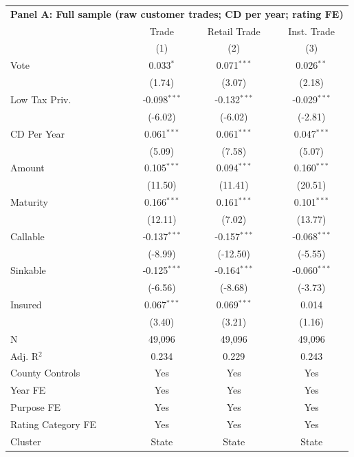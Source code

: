 \begingroup
\centering
\begin{tabular*}{\textwidth}{@{\extracolsep{\fill}}lccc}
\multicolumn{5}{l}{\textbf{Panel A: Full sample (raw customer trades; CD per year; rating FE)}}\\

\addlinespace
   \toprule
                      & Trade          & Retail Trade   & Inst. Trade\\  
                      & (1)            & (2)            & (3)\\  
   \midrule 
   Vote               & 0.033$^{*}$    & 0.071$^{***}$  & 0.026$^{**}$\\   
                      & (1.74)        & (3.07)        & (2.18)\\   
   Low Tax Priv.      & -0.098$^{***}$ & -0.132$^{***}$ & -0.029$^{***}$\\   
                      & (-6.02)       & (-6.02)       & (-2.81)\\   
   CD Per Year        & 0.061$^{***}$  & 0.061$^{***}$  & 0.047$^{***}$\\   
                      & (5.09)        & (7.58)        & (5.07)\\   
   Amount             & 0.105$^{***}$  & 0.094$^{***}$  & 0.160$^{***}$\\   
                      & (11.50)       & (11.41)       & (20.51)\\   
   Maturity           & 0.166$^{***}$  & 0.161$^{***}$  & 0.101$^{***}$\\   
                      & (12.11)       & (7.02)        & (13.77)\\   
   Callable           & -0.137$^{***}$ & -0.157$^{***}$ & -0.068$^{***}$\\   
                      & (-8.99)       & (-12.50)      & (-5.55)\\   
   Sinkable           & -0.125$^{***}$ & -0.164$^{***}$ & -0.060$^{***}$\\   
                      & (-6.56)       & (-8.68)       & (-3.73)\\   
   Insured            & 0.067$^{***}$  & 0.069$^{***}$  & 0.014\\   
                      & (3.40)        & (3.21)        & (1.16)\\   
   \hline
   N       & 49,096         & 49,096         & 49,096\\  
   Adj. R$^2$     & 0.234          & 0.229          & 0.243\\  
   County Controls    & Yes            & Yes            & Yes\\  
   Year FE            & Yes            & Yes            & Yes\\  
   Purpose FE         & Yes            & Yes            & Yes\\  
   Rating Category FE & Yes            & Yes            & Yes\\  
   Cluster              & State & State & State\\  
   \bottomrule
\end{tabular*}
\par\endgroup

